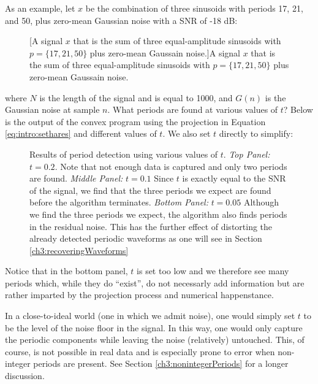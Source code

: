         As an example, let $x$ be the combination of three sinusoids with periods 17, 21, and 50, plus zero-mean Gaussian noise with a SNR of -18 dB:
        \begin{figure}[h]
            \centering
            \caption{[A signal $x$ that is the sum of three equal-amplitude sinusoids with $p = \{17, 21, 50\}$ plus zero-mean Gaussain noise.]A signal $x$ that is the sum of three equal-amplitude sinusoids with $p = \{17, 21, 50\}$ plus zero-mean Gaussain noise.}
            \label{fig:audioEffects:stopFunction:residual:sinesPlusNoise}
        \end{figure}
        where $N$ is the length of the signal and is equal to 1000, and $G(n)$ is the Gaussian noise at sample $n$. What periods are found at various values of $t$? Below is the output of the convex program using the projection in Equation \eqref{eq:intro:sethares} and different values of $t$. We also set $t$ directly to simplify:
        \begin{figure}[h]
            \centering
            \caption[A figure showing the effect of different threshold values for the stop function.]{Results of period detection using various values of $t$. \emph{Top Panel:} $t = 0.2$. Note that not enough data is captured and only two periods are found. \emph{Middle Panel:} $t = 0.1$ Since $t$ is exactly equal to the SNR of the signal, we find that the three periods we expect are found before the algorithm terminates. \emph{Bottom Panel:} $t = 0.05$ Although we find the three periods we expect, the algorithm also finds periods in the residual noise. This has the further effect of distorting the already detected periodic waveforms as one will see in Section \ref{ch3:recoveringWaveforms}}
            \label{fig:audioEffects:stopFunction:thresholdEffect}
        \end{figure}
        Notice that in the bottom panel, $t$ is set too low and we therefore see many periods which, while they do ``exist'', do not necessarly add information but are rather imparted by the projection process and numerical happenstance.

        In a close-to-ideal world (one in which we admit noise), one would simply set $t$ to be the level of the noise floor in the signal. In this way, one would only capture the periodic components while leaving the noise (relatively) untouched. This, of course, is not possible in real data and is especially prone to error when non-integer periods are present. See Section \ref{ch3:nonintegerPeriods} for a longer discussion.


